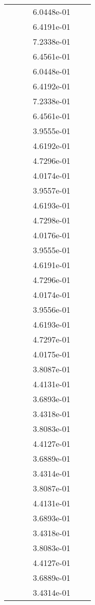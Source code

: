 \begin{xltabular}{\textwidth}{r|rS[table-format=1.3e+2]S[table-format=1.4e+2]S[table-format=1.4e+2]S[table-format=-1.5]}
&  &  & 6.0448e-01 & & \\
&  &  & 6.4191e-01 & & \\
&  &  & 7.2338e-01 & & \\
&  &  & 6.4561e-01 & & \\
&  &  & 6.0448e-01 & & \\
&  &  & 6.4192e-01 & & \\
&  &  & 7.2338e-01 & & \\
&  &  & 6.4561e-01 & & \\
&  &  & 3.9555e-01 & & \\
&  &  & 4.6192e-01 & & \\
&  &  & 4.7296e-01 & & \\
&  &  & 4.0174e-01 & & \\
&  &  & 3.9557e-01 & & \\
&  &  & 4.6193e-01 & & \\
&  &  & 4.7298e-01 & & \\
&  &  & 4.0176e-01 & & \\
&  &  & 3.9555e-01 & & \\
&  &  & 4.6191e-01 & & \\
&  &  & 4.7296e-01 & & \\
&  &  & 4.0174e-01 & & \\
&  &  & 3.9556e-01 & & \\
&  &  & 4.6193e-01 & & \\
&  &  & 4.7297e-01 & & \\
&  &  & 4.0175e-01 & & \\
&  &  & 3.8087e-01 & & \\
&  &  & 4.4131e-01 & & \\
&  &  & 3.6893e-01 & & \\
&  &  & 3.4318e-01 & & \\
&  &  & 3.8083e-01 & & \\
&  &  & 4.4127e-01 & & \\
&  &  & 3.6889e-01 & & \\
&  &  & 3.4314e-01 & & \\
&  &  & 3.8087e-01 & & \\
&  &  & 4.4131e-01 & & \\
&  &  & 3.6893e-01 & & \\
&  &  & 3.4318e-01 & & \\
&  &  & 3.8083e-01 & & \\
&  &  & 4.4127e-01 & & \\
&  &  & 3.6889e-01 & & \\
&  &  & 3.4314e-01 & & \\

\end{xltabular}
